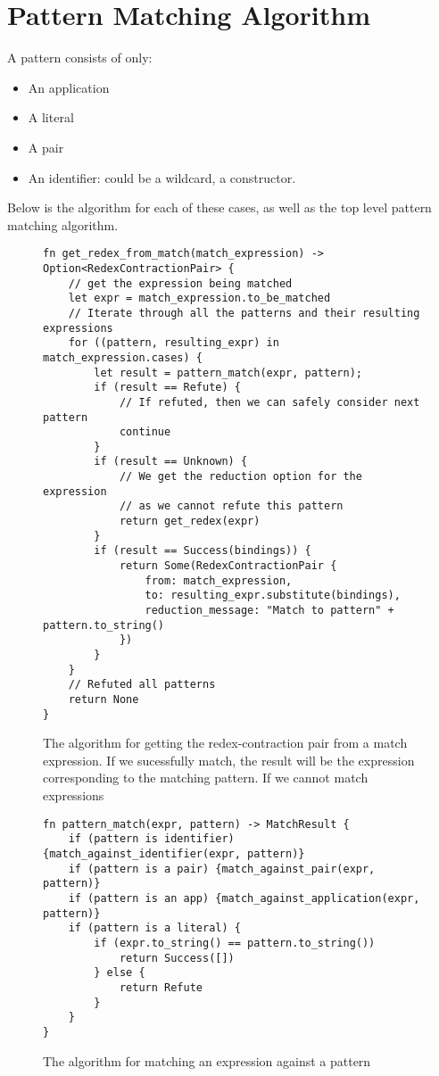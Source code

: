 \chapter{Pattern Matching Algorithm}
A pattern consists of only:
\begin{itemize}
    \item An application
    \item A literal
    \item A pair
    \item An identifier: could be a wildcard, a constructor.
\end{itemize}

Below is the algorithm for each of these cases, as well as the top level pattern matching algorithm. 

\begin{figure}[h]
    \begin{lstlisting}[language=Rust_boxed]
fn get_redex_from_match(match_expression) -> Option<RedexContractionPair> {
    // get the expression being matched
    let expr = match_expression.to_be_matched
    // Iterate through all the patterns and their resulting expressions
    for ((pattern, resulting_expr) in match_expression.cases) {
        let result = pattern_match(expr, pattern);
        if (result == Refute) {
            // If refuted, then we can safely consider next pattern
            continue
        }
        if (result == Unknown) {
            // We get the reduction option for the expression
            // as we cannot refute this pattern
            return get_redex(expr)
        }
        if (result == Success(bindings)) {
            return Some(RedexContractionPair {
                from: match_expression,
                to: resulting_expr.substitute(bindings),
                reduction_message: "Match to pattern" + pattern.to_string()
            })
        }
    }
    // Refuted all patterns
    return None
}
\end{lstlisting}
    \caption{The algorithm for getting the redex-contraction pair from a match expression. If we sucessfully match, the result will be the expression corresponding to the matching pattern. If we cannot match expressions}
    \label{fig:all_pattern_list_iterate}
\end{figure}

\begin{figure}[h]
    \begin{lstlisting}[language=Rust_boxed]
fn pattern_match(expr, pattern) -> MatchResult {
    if (pattern is identifier) {match_against_identifier(expr, pattern)}
    if (pattern is a pair) {match_against_pair(expr, pattern)}
    if (pattern is an app) {match_against_application(expr, pattern)}
    if (pattern is a literal) {
        if (expr.to_string() == pattern.to_string()) 
            return Success([])
        } else {
            return Refute
        }
    }
}
\end{lstlisting}
    \caption{The algorithm for matching an expression against a pattern}
    \label{fig:pattern_list_top_level}
\end{figure}

